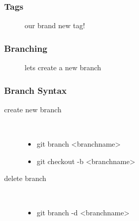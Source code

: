 \begin{frame}[fragile]
    \frametitle{Tags}
    \mytag
    \begin{figure}[b]{\textwidth}
        \centering
        \caption{our brand new tag!}
    \end{figure}
\end{frame}

\begin{frame}
    \frametitle{Branching}
    \begin{figure}[b]{\textwidth}
        \centering
        \caption{lets create a new branch}
    \end{figure}
\end{frame}

\begin{frame}
    \frametitle{Branch Syntax}
    \begin{description}
        \item[create new branch] \hfill \\
            \begin{itemize}
                \item git branch <branchname>
                \item git checkout -b <branchname>
            \end{itemize}
        \item[delete branch] \hfill \\
            \begin{itemize}
                \item git branch -d <branchname>
            \end{itemize}
    \end{description}
\end{frame}


